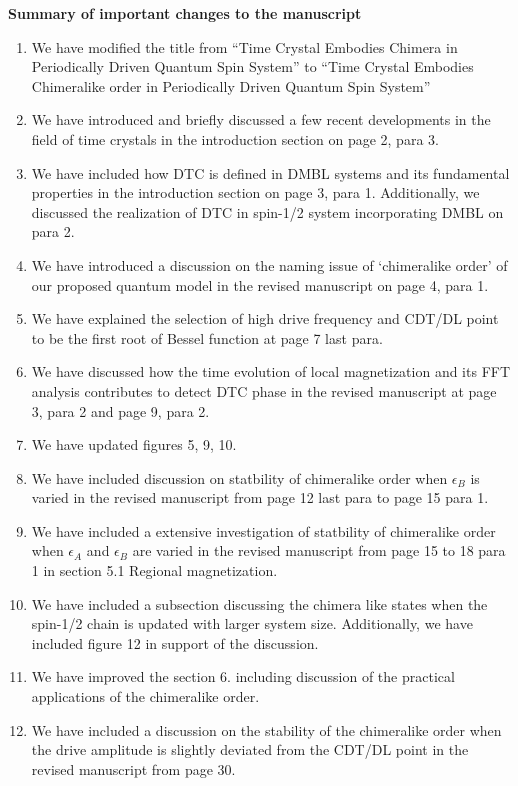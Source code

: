 \documentclass[aps,prb,reprint,showpacs,floatfix,superscriptaddress, onecolumn, nofootinbib, 10pt]{revtex4-2}
\begin{document}
\noindent \textbf{Summary of important changes to the  manuscript}
\begin{enumerate}
	\item We have modified the title from ``Time Crystal Embodies Chimera in Periodically Driven Quantum Spin System'' to ``Time Crystal Embodies Chimeralike order in Periodically Driven Quantum Spin System''
	\item We have introduced and briefly discussed a few recent developments in the field of time crystals in the introduction section on page 2, para 3.
	\item We have included how DTC is defined in DMBL systems and its fundamental properties in the introduction section on page 3, para 1. Additionally, we discussed the realization of DTC in spin-1/2 system incorporating DMBL on para 2.
	\item We have introduced a discussion on the naming issue of `chimeralike order' of our proposed quantum model in the revised manuscript on page 4, para 1.
	\item We have explained the selection of high drive frequency and CDT/DL point to be the first root of Bessel function at page 7 last para.
	\item We have discussed how the time evolution of local magnetization and its FFT analysis contributes to detect DTC phase in the revised manuscript at page 3, para 2 and page 9, para 2.
	\item We have updated figures 5, 9, 10.
	\item We have included discussion on statbility of chimeralike order when $\epsilon_B$ is varied in the revised manuscript from page 12 last para to page 15 para 1.
	\item We have included a extensive investigation of statbility of chimeralike order when $\epsilon_A$ and $\epsilon_B$ are varied in the revised manuscript from page 15 to 18 para 1 in section 5.1 Regional magnetization.
	\item We have included a subsection discussing the chimera like states when the spin-1/2 chain is updated with larger system size. Additionally, we have included figure 12 in support of the discussion.
	\item We have improved the section 6. including discussion of the practical applications of the chimeralike order.
	\item We have included a discussion on the stability of the chimeralike order when the drive amplitude is slightly deviated from the CDT/DL point in the revised manuscript from page 30. 
 \end{enumerate}



\end{document}
